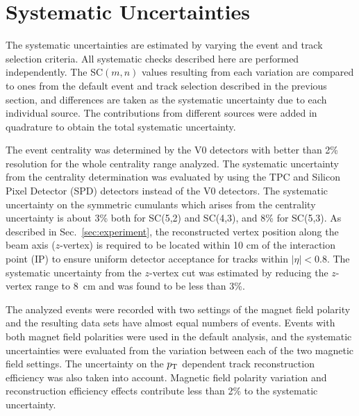 \section{Systematic Uncertainties}
\label{sec:uncertainties}



The systematic uncertainties are estimated by varying the event and track selection criteria. All systematic checks described here are performed independently. 
The SC$(m,n)$ values resulting from each variation are compared to ones from the default event and track selection described in the previous section,
and differences are taken as the systematic uncertainty due to each individual source.
The contributions from different sources were added in quadrature to obtain the total systematic uncertainty.

The event centrality was determined by the V0 detectors \cite{Abbas:2013taa} with better than 2\%  resolution for the whole centrality range analyzed. The systematic uncertainty from the centrality determination was evaluated by using the TPC and Silicon Pixel Detector (SPD) \cite{Dellacasa:1999kf} detectors instead of the V0 detectors. 
The systematic uncertainty on the symmetric cumulants which arises from the centrality uncertainty is about 3\% both for SC(5,2) and SC(4,3), and 8\% for  SC(5,3).
As described in Sec.~\ref{sec:experiment}, the reconstructed vertex position along the beam axis ($z$-vertex) is required to be located within 10 cm of the interaction point (IP) to ensure uniform detector acceptance for tracks within $|\eta|<0.8$. The systematic uncertainty from the $z$-vertex cut was estimated by reducing the $z$-vertex range to 8~cm and was found to be less than 3\%.  

The analyzed events were recorded with two settings of the magnet field polarity and the resulting data sets have almost equal numbers of events. Events with both magnet field polarities were used in the default analysis, and the systematic uncertainties were evaluated from the variation between each of the two magnetic field settings. 
The uncertainty on the $p_{\rm T}$ dependent track reconstruction efficiency was also taken into account.
Magnetic field polarity variation and reconstruction efficiency effects contribute less than 2\% to the systematic uncertainty.

